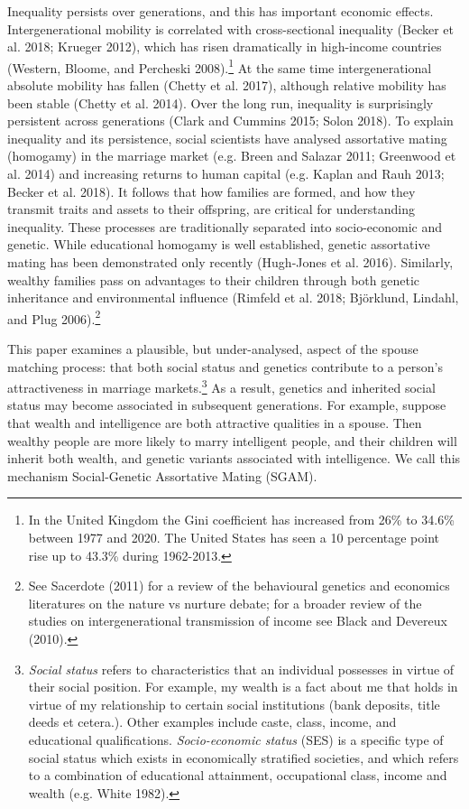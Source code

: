 \documentclass[
]{article}
\begin{document}
Inequality persists over generations, and this has important economic effects.
Intergenerational mobility is correlated with cross-sectional inequality
(Becker et al. 2018; Krueger 2012), which has risen dramatically in
high-income countries (Western, Bloome, and Percheski 2008).\footnote{In the United Kingdom the Gini coefficient has increased from 26\% to 34.6\% between 1977 and 2020. The United States has seen a 10 percentage point rise up to 43.3\% during 1962-2013.} At the same time
intergenerational absolute mobility has fallen (Chetty et al. 2017), although
relative mobility has been stable (Chetty et al. 2014). Over the long run,
inequality is surprisingly persistent across generations
(Clark and Cummins 2015; Solon 2018). To explain inequality and its
persistence, social scientists have analysed assortative mating (homogamy) in
the marriage market (e.g. Breen and Salazar 2011; Greenwood et al. 2014) and
increasing returns to human capital (e.g. Kaplan and Rauh 2013; Becker et al. 2018). It
follows that how families are formed, and how they transmit traits and assets to
their offspring, are critical for understanding inequality. These processes are
traditionally separated into socio-economic and genetic. While educational
homogamy is well established, genetic assortative mating has been demonstrated
only recently (Hugh-Jones et al. 2016). Similarly, wealthy families pass on
advantages to their children through both genetic inheritance and environmental
influence (Rimfeld et al. 2018; Björklund, Lindahl, and Plug 2006).\footnote{See Sacerdote (2011) for a review of the behavioural genetics and
  economics literatures on the nature vs nurture debate; for a broader review of
  the studies on intergenerational transmission of income see Black and Devereux (2010).}

This paper examines a plausible, but under-analysed, aspect of the spouse
matching process: that both social status and genetics contribute to a person's
attractiveness in marriage markets.\footnote{\emph{Social status} refers to characteristics that an individual
  possesses in virtue of their social position. For example, my wealth
  is a fact about me that holds in virtue of my relationship to
  certain social institutions (bank deposits, title deeds et cetera.).
  Other examples include caste, class, income, and educational
  qualifications. \emph{Socio-economic status} (SES) is a specific type of
  social status which exists in economically stratified societies, and
  which refers to a combination of educational attainment,
  occupational class, income and wealth (e.g. White 1982).} As a result, genetics and
inherited social status may become associated in subsequent generations. For
example, suppose that wealth and intelligence are both attractive qualities in a
spouse. Then wealthy people are more likely to marry intelligent people, and
their children will inherit both wealth, and genetic variants associated with
intelligence. We call this mechanism Social-Genetic Assortative Mating (SGAM).
\end{document}
